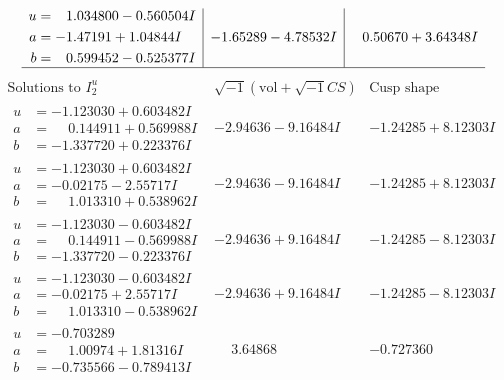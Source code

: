 \documentclass[1p]{elsarticle_modified}
\theoremstyle{definition}
\newcommand{\I}{\sqrt{-1}}
\begin{document}
$$\begin{array}{c|c|c}
\begin{aligned}
u &= \phantom{-}1.034800 - 0.560504 I \\
a &= -1.47191 + 1.04844 I \\
b &= \phantom{-}0.599452 - 0.525377 I\end{aligned}
 & -1.65289 - 4.78532 I & \phantom{-}0.50670 + 3.64348 I\\
 \hline 
 \end{array}$$\newpage$$\begin{array}{c|c|c}  
\text{Solutions to }I^u_{2}& \I (\text{vol} + \sqrt{-1}CS) & \text{Cusp shape}\\
 \hline 
\begin{aligned}
u &= -1.123030 + 0.603482 I \\
a &= \phantom{-}0.144911 + 0.569988 I \\
b &= -1.337720 + 0.223376 I\end{aligned}
 & -2.94636 - 9.16484 I & -1.24285 + 8.12303 I \\ \hline\begin{aligned}
u &= -1.123030 + 0.603482 I \\
a &= -0.02175 - 2.55717 I \\
b &= \phantom{-}1.013310 + 0.538962 I\end{aligned}
 & -2.94636 - 9.16484 I & -1.24285 + 8.12303 I \\ \hline\begin{aligned}
u &= -1.123030 - 0.603482 I \\
a &= \phantom{-}0.144911 - 0.569988 I \\
b &= -1.337720 - 0.223376 I\end{aligned}
 & -2.94636 + 9.16484 I & -1.24285 - 8.12303 I \\ \hline\begin{aligned}
u &= -1.123030 - 0.603482 I \\
a &= -0.02175 + 2.55717 I \\
b &= \phantom{-}1.013310 - 0.538962 I\end{aligned}
 & -2.94636 + 9.16484 I & -1.24285 - 8.12303 I \\ \hline\begin{aligned}
u &= -0.703289\phantom{ +0.000000I} \\
a &= \phantom{-}1.00974 + 1.81316 I \\
b &= -0.735566 - 0.789413 I\end{aligned}
 & \phantom{-}3.64868\phantom{ +0.000000I} & -0.727360\phantom{ +0.000000I} \\ \hline\begin{aligned}

\end{aligned}
\end{array}$$
\end{document}
